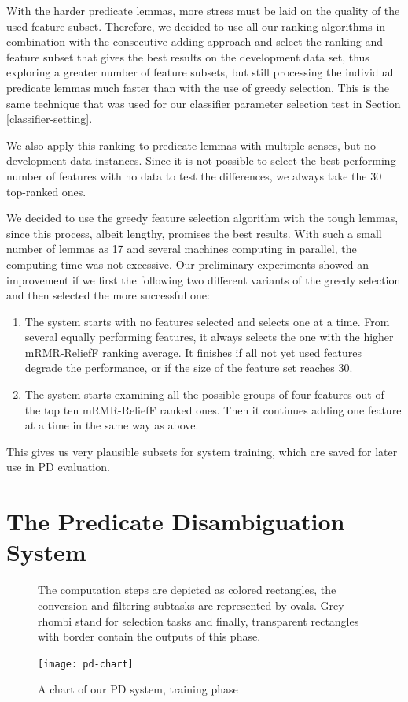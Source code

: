 \documentclass[12pt,notitlepage]{report}
\begin{document}
With the harder predicate lemmas, more stress must be laid on the quality of the used feature subset. Therefore, we decided to use all our ranking algorithms in combination with the consecutive adding approach and select the ranking and feature subset that gives the best results on the development data set, thus exploring a greater number of feature subsets, but still processing the individual predicate lemmas much faster than with the use of greedy selection. This is the same technique that was used for our classifier parameter selection test in Section \ref{classifier-setting}. 

We also apply this ranking to predicate lemmas with multiple senses, but no development data instances. Since it is not possible to select the best performing number of features with no data to test the differences, we always take the 30 top-ranked ones.

We decided to use the greedy feature selection algorithm with the tough lemmas, since this process, albeit lengthy, promises the best results. With such a small number of lemmas as 17 and several machines computing in parallel, the computing time was not excessive. Our preliminary experiments showed an improvement if we first the following two different variants of the greedy selection and then selected the more successful one:
\begin{enumerate}
    \item The system starts with no features selected and selects one at a time. From several equally performing features, it always selects the one with the higher mRMR-ReliefF ranking average. It finishes if all not yet used features degrade the performance, or if the size of the feature set reaches 30.
    \item The system starts examining all the possible groups of four features out of the top ten mRMR-ReliefF ranked ones. Then it continues adding one feature at a time in the same way as above.
\end{enumerate}
This gives us very plausible subsets for system training, which are saved for later use in PD evaluation.

\section{The Predicate Disambiguation System}\label{pd-overview}

\begin{figure}[p]
\caption{A chart of our PD system, training phase}\label{fig:pd-schema}
\noindent\footnotesize The computation steps are depicted as colored rectangles, the conversion and filtering subtasks are represented by ovals. Grey rhombi stand for selection tasks and finally, transparent rectangles with border contain the outputs of this phase.
\begin{center}
\texttt{[image: pd-chart]}
\end{center}
\end{figure}
\end{document}
